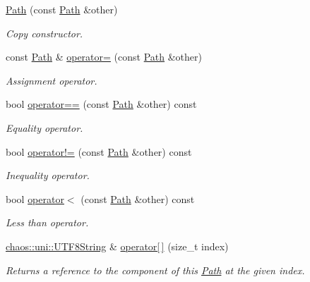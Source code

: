 \begin{DoxyCompactItemize}
\hyperlink{classchaos_1_1io_1_1sys_1_1_path_a40b3bf651b667adbd3eeb1ee55564211}{Path} (const \hyperlink{classchaos_1_1io_1_1sys_1_1_path}{Path} \&other)
\begin{DoxyCompactList}\small\item\em Copy constructor. \end{DoxyCompactList}\item 
const \hyperlink{classchaos_1_1io_1_1sys_1_1_path}{Path} \& \hyperlink{classchaos_1_1io_1_1sys_1_1_path_a45c70fc34ff619e890d5bc807dd70d8b}{operator=} (const \hyperlink{classchaos_1_1io_1_1sys_1_1_path}{Path} \&other)
\begin{DoxyCompactList}\small\item\em Assignment operator. \end{DoxyCompactList}\item 
bool \hyperlink{classchaos_1_1io_1_1sys_1_1_path_ac2e63307a0526625f4447f1d2a704e3b}{operator==} (const \hyperlink{classchaos_1_1io_1_1sys_1_1_path}{Path} \&other) const 
\begin{DoxyCompactList}\small\item\em Equality operator. \end{DoxyCompactList}\item 
bool \hyperlink{classchaos_1_1io_1_1sys_1_1_path_acd6dea0a797c0307179a5523239a299a}{operator!=} (const \hyperlink{classchaos_1_1io_1_1sys_1_1_path}{Path} \&other) const 
\begin{DoxyCompactList}\small\item\em Inequality operator. \end{DoxyCompactList}\item 
bool \hyperlink{classchaos_1_1io_1_1sys_1_1_path_a90858bbce348d5b36d0c31d771c601d8}{operator$<$} (const \hyperlink{classchaos_1_1io_1_1sys_1_1_path}{Path} \&other) const 
\begin{DoxyCompactList}\small\item\em Less than operator. \end{DoxyCompactList}\item 
\hyperlink{classchaos_1_1uni_1_1_u_t_f8_string}{chaos\+::uni\+::\+U\+T\+F8\+String} \& \hyperlink{classchaos_1_1io_1_1sys_1_1_path_ae7503e76ec85786225fc25b572deaeea}{operator\mbox{[}$\,$\mbox{]}} (size\+\_\+t index)
\begin{DoxyCompactList}\small\item\em Returns a reference to the component of this \hyperlink{classchaos_1_1io_1_1sys_1_1_path}{Path} at the given index. \end{DoxyCompactList}\item 

\end{DoxyCompactItemize}

